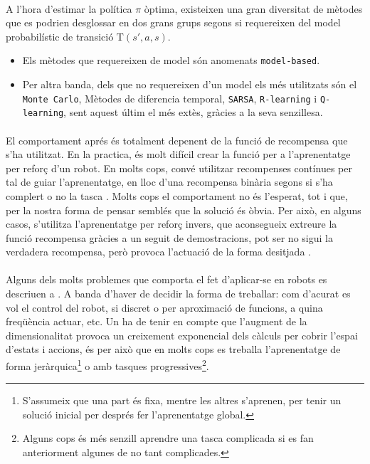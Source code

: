 \documentclass[12pt,a4paper,final,twoside]{article}
\begin{document}
\paragraph{}A l'hora d'estimar la política $\pi$ òptima, existeixen una gran diversitat de mètodes que es podrien desglossar en dos grans grups segons si requereixen del model probabilístic de transició T$(s',a,s)$.

\begin{itemize}

\item Els mètodes que requereixen de model són anomenats \texttt{model-based}.

\item Per altra banda, dels que no requereixen d'un model els més utilitzats són el \texttt{Monte Carlo}, Mètodes de diferencia temporal, \texttt{SARSA}, \texttt{R-learning} i \texttt{Q-learning}, sent aquest últim el més extès, gràcies a la seva senzillesa.

\end{itemize}

\paragraph{}El comportament aprés és totalment depenent de la funció de recompensa que s'ha utilitzat. En la practica, és molt difícil crear la funció per a l'aprenentatge per reforç d'un robot. En molts cops, convé utilitzar recompenses contínues per tal de guiar l'aprenentatge, en lloc d'una recompensa binària segons si s'ha complert o no la tasca \cite{Laud2004}. Molts cops el comportament no és l'esperat, tot i que, per la nostra forma de pensar semblés que la solució és òbvia. Per això, en alguns casos, s'utilitza l'aprenentatge per reforç invers, que aconsegueix extreure la funció recompensa gràcies a un seguit de demostracions, pot ser no sigui la verdadera recompensa, però provoca l'actuació de la forma desitjada \cite{Kober2009}.

\paragraph{}Alguns dels molts problemes que comporta el fet d'aplicar-se en robots es descriuen a \cite{Kober2009}. A banda d'haver de decidir la forma de treballar: com d'acurat es vol el control del robot, si discret o per aproximació de funcions, a quina freqüència actuar, etc. Un ha de tenir en compte que l'augment de la dimensionalitat provoca un creixement exponencial dels càlculs per cobrir l'espai d'estats i accions, és per això que en molts cops es treballa l'aprenentatge de forma jeràrquica\footnote{S'assumeix que una part és fixa, mentre les altres s'aprenen, per tenir un solució inicial per després fer l'aprenentatge global.} o amb tasques progressives\footnote{Alguns cops és més senzill aprendre una tasca complicada si es fan anteriorment algunes de no tant complicades.}. 
\end{document}
